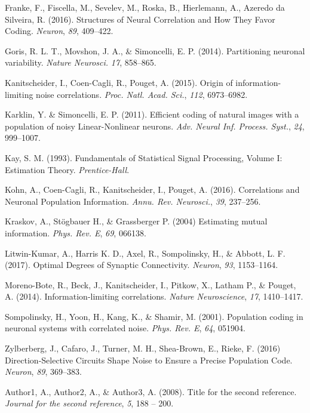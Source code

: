 \documentclass[12pt]{article}
\begin{document}
\begin{thebibliography}{100}
Franke, F., Fiscella, M., Sevelev, M., Roska, B., Hierlemann, A., Azeredo da Silveira, R. (2016).
\newblock Structures of Neural Correlation and How They Favor Coding.
\newblock \emph{Neuron}, \emph{89}, 409--422.

Goris, R. L. T., Movshon, J. A., \& Simoncelli, E. P. (2014).
\newblock Partitioning neuronal variability.
\newblock \emph{Nature Neurosci.} \emph{17}, 858--865.

Kanitscheider, I., Coen-Cagli, R., Pouget, A. (2015).
\newblock Origin of information-limiting noise correlations.
\newblock \emph{Proc. Natl. Acad. Sci.}, \emph{112}, 6973--6982.

Karklin, Y. \& Simoncelli, E. P. (2011).
\newblock Efficient coding of natural images with a population of noisy
Linear-Nonlinear neurons.
\newblock \emph{Adv. Neural Inf. Process. Syst.}, \emph{24}, 999--1007.

Kay, S. M. (1993).
\newblock Fundamentals of Statistical Signal Processing, Volume I: Estimation Theory.
\newblock \emph{Prentice-Hall}.

Kohn, A., Coen-Cagli, R., Kanitscheider, I., Pouget, A. (2016).
\newblock Correlations and Neuronal Population Information.
\newblock \emph{Annu. Rev. Neurosci.}, \emph{39}, 237--256.

Kraskov, A., St{\"o}gbauer H., \& Grassberger P. (2004)
\newblock Estimating mutual information.
\newblock \emph{Phys. Rev. E},
\emph{69}, 066138.

Litwin-Kumar, A., Harris K. D., Axel, R., Sompolinsky, H., \& Abbott, L. F. (2017).
\newblock Optimal Degrees of Synaptic Connectivity.
\newblock \emph{Neuron}, \emph{93}, 1153--1164.

Moreno-Bote, R., Beck, J., Kanitscheider, I., Pitkow, X., Latham P., \& Pouget, A. (2014).
\newblock Information-limiting correlations.
\newblock \emph{Nature Neuroscience}, \emph{17}, 1410--1417.

Sompolinsky, H., Yoon, H., Kang, K., \& Shamir, M. (2001).
Population coding in neuronal systems with correlated noise.
\newblock \emph{Phys. Rev. E}, \emph{64}, 051904.

Zylberberg, J., Cafaro, J., Turner, M. H., Shea-Brown, E., Rieke, F. (2016)
\newblock Direction-Selective Circuits Shape Noise to Ensure a Precise Population Code.
\newblock \emph{Neuron}, \emph{89}, 369--383.



Author1, A., Author2, A., \& Author3, A. (2008).
\newblock Title for the second reference.
\newblock \emph{Journal for the second reference}, \emph{5}, 188 -- 200.

\end{thebibliography}
\end{document}
